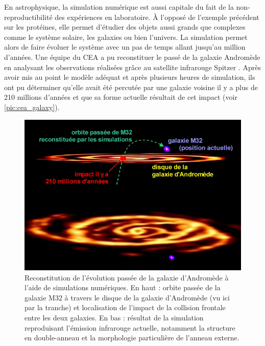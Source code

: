         En astrophysique, la simulation numérique est aussi capitale du fait de la non-reproductibilité des expériences en laboratoire.  À l'opposé de l'exemple précédent sur les protéines, elle permet d'étudier des objets aussi grands que complexes comme le système solaire, les galaxies ou bien l'univers. La simulation permet alors de faire évoluer le système avec un pas de temps allant jusqu'au million d'années. Une équipe du CEA a pu reconstituer le passé de la galaxie Andromède en analysant les observations réalisées grâce au satellite infrarouge Spitzer \cite{Block2006a}. Après avoir mis au point le modèle adéquat et après plusieurs heures de simulation, ils ont pu déterminer qu'elle avait été percutée par une galaxie voisine il y a plus de 210 millions d'années et que sa forme actuelle résultait de cet impact (voir \autoref{pic:cea_galaxy}).
    
        
        \begin{figure}
            \center
            \includegraphics[width=14cm]{images/cea_galaxy2.png}
            \caption{\label{pic:cea_galaxy} Reconstitution de l'évolution passée de la galaxie d'Andromède à l'aide de simulations numériques. En haut : orbite passée de la galaxie M32 à travers le disque de la galaxie d'Andromède (vu ici par la tranche) et localisation de l'impact de la collision frontale entre les deux galaxies. En bas : résultat de la simulation reproduisant l'émission infrarouge actuelle, notamment la structure en double-anneau et la morphologie particulière de l'anneau externe\protect\footnotemark.}
        \end{figure}

